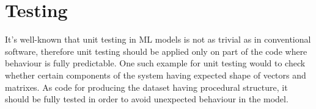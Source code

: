 {\section{Testing}
It's well-known that unit testing in ML models is not as trivial
as in conventional software,
therefore unit testing should be applied only on part of the code where
behaviour is fully predictable. One such example for unit testing would to check whether
certain components of the system having expected shape of vectors and matrixes.
As code for producing the dataset having procedural structure,
it should be fully tested in order to avoid
unexpected behaviour in the model.


%
%








%
%





}
